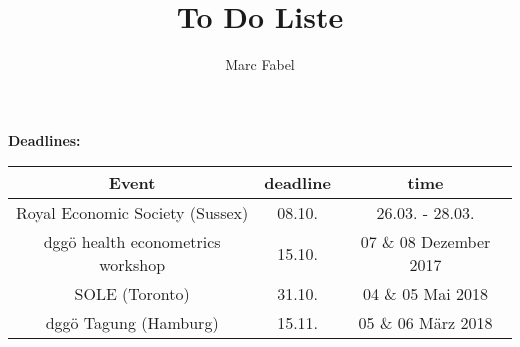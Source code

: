 \documentclass[11pt,a4paper]{article}
\author{Marc Fabel}
\title{To Do Liste}
\date{\flushleft{Last revision of the document: \today}}
\begin{document}
\maketitle




\textbf{Deadlines:}\newline
\begin{tabular}{ccc}
\hline 
Event & deadline & time	 \\ 
\hline 
Royal Economic Society (Sussex) &  08.10.     &26.03. - 28.03. \\
dggö health econometrics workshop & 15.10. & 07 \& 08 Dezember 2017 \\ 
SOLE (Toronto) & 31.10. & 04 \& 05 Mai 2018\\
dggö Tagung (Hamburg)& 15.11. & 05 \& 06 März 2018 \\ 
\hline 
\end{tabular} 
\end{document}
